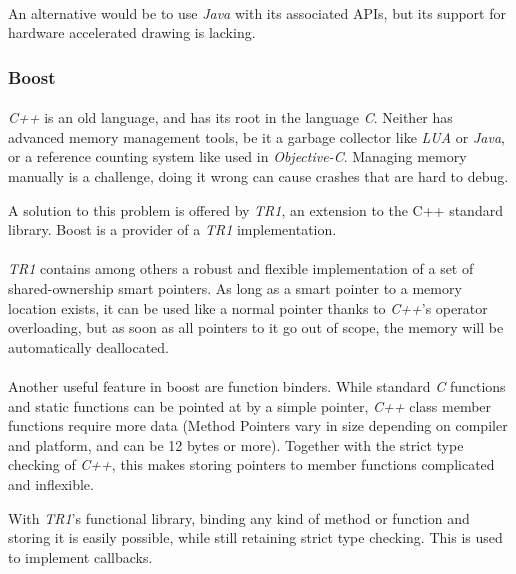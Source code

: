 \paragraph{}
An alternative would be to use \textit{Java} with its associated APIs, but its support for hardware accelerated drawing is lacking.


\subsubsection{Boost\label{FrameworkBoost}}
\paragraph{}
\textit{C++} is an old language, and has its root in the language \textit{C}.
Neither has advanced memory management tools, be it a garbage collector like \textit{LUA} or \textit{Java}, or a reference counting system like used in \textit{Objective-C}.
Managing memory manually is a challenge, doing it wrong can cause crashes that are hard to debug.

A solution to this problem is offered by \textit{TR1}, an extension to the C++ standard library.
Boost\cite{boost} is a provider of a \textit{TR1} implementation.

\paragraph{}
\textit{TR1} contains among others a robust and flexible implementation of a set of shared-ownership smart pointers.
As long as a smart pointer to a memory location exists, it can be used like a normal pointer thanks to \textit{C++}'s operator overloading,
but as soon as all pointers to it go out of scope, the memory will be automatically deallocated.

\paragraph{}
Another useful feature in boost are function binders.
While standard \textit{C} functions and static functions can be pointed at by a simple pointer,
\textit{C++} class member functions require more data
(Method Pointers vary in size depending on compiler and platform, and can be 12 bytes or more).
Together with the strict type checking of \textit{C++}, this makes storing pointers to member functions complicated and inflexible.

With \textit{TR1}'s functional library, binding any kind of method or function and storing it is easily possible, while still retaining strict type checking.
This is used to implement callbacks.


